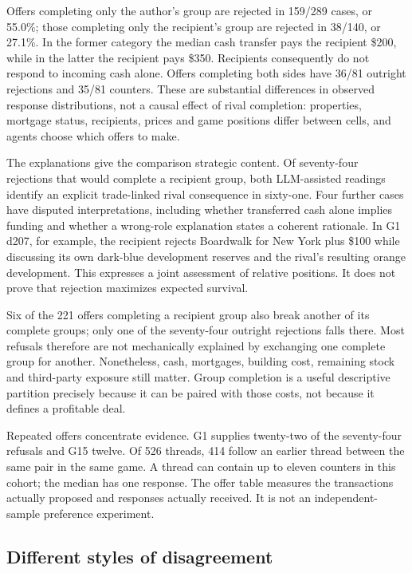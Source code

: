 Offers completing only the author's group are rejected in 159/289 cases, or 55.0\%; those completing only the recipient's group are rejected in 38/140, or 27.1\%. In the former category the median cash transfer pays the recipient \$200, while in the latter the recipient pays \$350. Recipients consequently do not respond to incoming cash alone. Offers completing both sides have 36/81 outright rejections and 35/81 counters. These are substantial differences in observed response distributions, not a causal effect of rival completion: properties, mortgage status, recipients, prices and game positions differ between cells, and agents choose which offers to make.

The explanations give the comparison strategic content. Of seventy-four rejections that would complete a recipient group, both LLM-assisted readings identify an explicit trade-linked rival consequence in sixty-one. Four further cases have disputed interpretations, including whether transferred cash alone implies funding and whether a wrong-role explanation states a coherent rationale. In G1 d207, for example, the recipient rejects Boardwalk for New York plus \$100 while discussing its own dark-blue development reserves and the rival's resulting orange development. This expresses a joint assessment of relative positions. It does not prove that rejection maximizes expected survival.

Six of the 221 offers completing a recipient group also break another of its complete groups; only one of the seventy-four outright rejections falls there. Most refusals therefore are not mechanically explained by exchanging one complete group for another. Nonetheless, cash, mortgages, building cost, remaining stock and third-party exposure still matter. Group completion is a useful descriptive partition precisely because it can be paired with those costs, not because it defines a profitable deal.

Repeated offers concentrate evidence. G1 supplies twenty-two of the seventy-four refusals and G15 twelve. Of 526 threads, 414 follow an earlier thread between the same pair in the same game. A thread can contain up to eleven counters in this cohort; the median has one response. The offer table measures the transactions actually proposed and responses actually received. It is not an independent-sample preference experiment.

\subsection{Different styles of disagreement}

